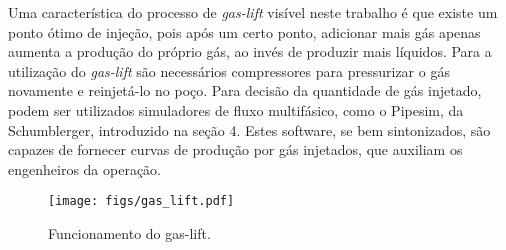 Uma característica do processo de \textit{gas-lift} visível neste trabalho é que existe um ponto ótimo de injeção, pois após um certo ponto, adicionar mais gás apenas aumenta a produção do próprio gás, ao invés de produzir mais líquidos.
%
Para a utilização do \textit{gas-lift} são necessários compressores para pressurizar o gás novamente e reinjetá-lo no poço.
%
Para decisão da quantidade de gás injetado, podem ser utilizados simuladores de fluxo multifásico, como o Pipesim, da Schumblerger, introduzido na seção 4. Estes software, se bem sintonizados, são capazes de fornecer curvas de produção por gás injetados, que auxiliam os engenheiros da operação.



\begin{figure}
\centering
	  \texttt{[image: figs/gas\_lift.pdf]}
  \caption{Funcionamento do gas-lift.}
  \label{fig:setup3_triang}
\end{figure}

